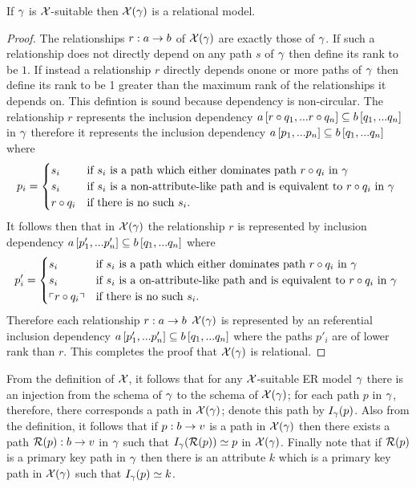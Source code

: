 \begin{lemma}
If $\gamma$ is $\mathcal{X}$-suitable then $\mathcal{X}(\gamma)$ is a relational model.
\end{lemma}
\begin{proof}
The relationships $r: a \rightarrow b$ of $\mathcal{X}(\gamma)$ are exactly those of $\gamma$. If such a relationship does not directly depend on any path $s$ of $\gamma$ then define its rank to be $1$.
If instead a relationship $r$ directly depends onone or more paths of $\gamma$ then define its rank to be 1 greater than the maximum rank of the relationships it depends on. 
This defintion is sound because dependency is non-circular.
The relationship $r$ represents the inclusion dependency $a\left[r \circ q_1,...r \circ q_n\right]\subseteq b\left[q_1,...q_n\right]$ in $\gamma$ therefore it represents
the inclusion dependency $a\left[p_1,...p_n\right]\subseteq b\left[q_1,...q_n\right]$ where 
$$
p_i =
\begin{cases} 
    s_i         & \mbox{if $s_i$ is a path which either dominates path $r \circ q_i$ in $\gamma$} \\
    s_i         & \mbox{if $s_i$ is a non-attribute-like path and is equivalent to  $r \circ q_i$ in $\gamma$ }  \\
    r \circ q_i & \mbox{if there is no such $s_i$.}
\end{cases} 
$$
It follows then that in $\mathcal{X}(\gamma)$ the relationship $r$ is represented by inclusion dependency $a\left[p'_1,...p'_n\right]\subseteq b\left[q_1,...q_n\right]$ where
$$
p'_i =
\begin{cases}
   s_i     & \mbox{if $s_i$ is a path which either dominates path $r \circ q_i$ in $\gamma$} \\
   s_i     & \mbox{if $s_i$ is a on-attribute-like path and is equivalent to  $r \circ q_i$ in $\gamma$ }  \\
   \left\ulcorner r \circ q_i\right\urcorner  & \mbox{if there is no such $s_i$.}
\end{cases} 
$$
Therefore each relationship $r: a \rightarrow b$ $\mathcal{X}(\gamma)$ is represented by an referential inclusion dependency $a\left[p'_1,...p'_n\right]\subseteq b\left[q_1,...q_n\right]$
where the paths $p'_i$ are of lower rank than $r$. This completes the proof that $\mathcal{X}(\gamma)$ is relational.
\end{proof}


From the definition of $\mathcal{X}$, it follows that for any $\mathcal{X}$-suitable ER model $\gamma$ there is an injection from the schema of $\gamma$ to the schema of $\mathcal{X}(\gamma)$; for each path $p$ in $\gamma$, therefore, there corresponds a path 
in $\mathcal{X}(\gamma)$; denote this path by  $I_\gamma(p)$. Also from the definition, it follows that
if $p:b \rightarrow v$ is a path in $\mathcal{X}(\gamma)$ then there exists a path $\mathcal{R}(p):b \rightarrow v$ in $\gamma$ such that $I_\gamma(\mathcal{R}(p)) \simeq p$ in $\mathcal{X}(\gamma)$. Finally note that if $\mathcal{R}(p)$ is a primary key path in $\gamma$ then there is an attribute $k$ which is a primary key path
in $\mathcal{X}(\gamma)$ such that $I_\gamma(p) \simeq k$. 



